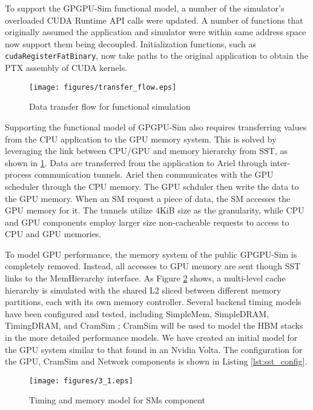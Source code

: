 To support the GPGPU-Sim functional model, a number of the simulator's overloaded
CUDA Runtime API calls were updated. A number of functions that originally assumed
the application and simulator were within same address space now support them being
decoupled. Initialization functions, such as \texttt{\textunderscore \textunderscore
cudaRegisterFatBinary}, now take paths to the original application to obtain the PTX
assembly of CUDA kernels.


   \begin{figure}[!htb]
      \centering
      \setlength{\abovecaptionskip}{6pt plus 1pt minus 1pt}
      \texttt{[image: figures/transfer\_flow.eps]}
      \captionsetup{width=.75\textwidth}
      \caption{Data transfer flow for functional simulation}
      \label{fig:gpu_transfer_model}
   \end{figure}

Supporting the functional model of GPGPU-Sim also requires transferring values
from the CPU application to the GPU memory system. This is solved by leveraging
the link between CPU/GPU and memory hierarchy from SST, as shown in
\ref{fig:gpu_transfer_model}. Data are transferred from the application to Ariel through
inter-process communication tunnels. Ariel then communicates with the GPU scheduler through
the CPU memory. The GPU schduler then write the data to the GPU memory. When an SM
request a piece of data, the SM accesses the GPU memory for it.
The tunnels utilize 4KiB size as the granularity, while CPU and GPU components
employ larger size non-cacheable requests to access to CPU and GPU memories.

To model GPU performance, the memory system of the public GPGPU-Sim is
completely removed. Instead, all accesses to GPU memory are sent though SST
links to the MemHierarchy interface. As Figure \ref{fig:gpu_mem_model} shows, a
multi-level cache hierarchy is simulated with the shared L2 sliced between
different memory partitions, each with its own memory controller. Several
backend timing models have been configured and tested, including SimpleMem,
SimpleDRAM, TimingDRAM, and CramSim \cite{healy2017}; CramSim will be used to
model the HBM stacks in the more detailed performance models. We have created an
initial model for the GPU system similar to that found in an Nvidia Volta. The
configuration for the GPU, CramSim and Network components is shown in Listing
\ref{lst:sst_config}.


   \begin{figure}[!htb]
      \centering
      \setlength{\abovecaptionskip}{6pt plus 1pt minus 1pt}
      \texttt{[image: figures/3\_1.eps]}
      \captionsetup{width=.75\textwidth}
      \caption{Timing and memory model for SMs component}
      \label{fig:gpu_mem_model}
   \end{figure}


